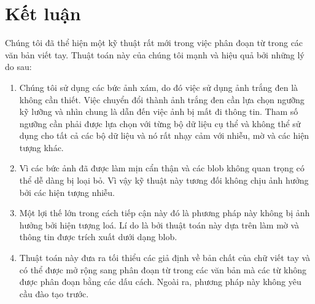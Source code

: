\documentclass[a4paper]{article}
\begin{document}
\section{Kết luận}
Chúng tôi đã thể hiện một kỹ thuật rất mới trong việc phân đoạn từ trong các văn bản viết tay. Thuật toán này của chúng tôi mạnh và hiệu quả bởi những lý do sau:
\begin{enumerate}
    \item Chúng tôi sử dụng các bức ảnh xám, do đó việc sử dụng ảnh trắng đen là không cần thiết. Việc chuyển đổi thành ảnh trắng đen cần lựa chọn ngưỡng kỹ lưỡng và nhìn chung là dẫn đến việc ảnh bị mất đi thông tin. Tham số ngưỡng cần phải được lựa chọn với từng bộ dữ liệu cụ thể và không thể sử dụng cho tất cả các bộ dữ liệu và nó rất nhạy cảm với nhiễu, mờ và các hiện tượng khác.
    \item Vì các bức ảnh đã được làm mịn cẩn thận và các blob không quan trọng có thể dễ dàng bị loại bỏ. Vì vậy kỹ thuật này tương đối không chịu ảnh hưởng bởi các hiện tượng nhiễu.
    \item Một lợi thế lớn trong cách tiếp cận này đó là phương pháp này không bị ảnh hưởng bởi hiện tượng loá. Lí do là bởi thuật toán này dựa trên làm mờ và thông tin được trích xuất dưới dạng blob.
    \item Thuật toán này đưa ra tối thiểu các giả định về bản chất của chữ viết tay và có thể được mở rộng sang phân đoạn từ trong các văn bản mà các từ không được phân đoạn bằng các dấu cách. Ngoài ra, phương pháp này không yêu cầu đào tạo trước.
\end{enumerate}
\end{document}
